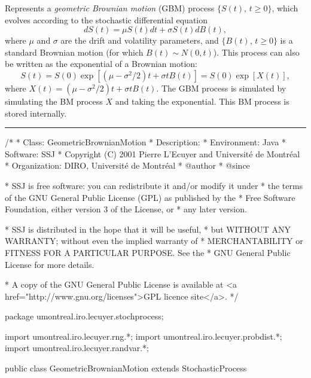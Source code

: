 
Represents a \emph{geometric Brownian motion} (GBM) process $\{S(t),\, t\ge 0\}$,  
which evolves according to the stochastic differential equation 
\begin{equation}
   dS(t) = \mu S(t) dt + \sigma S(t) dB(t),
                                               \label{eq:GBM}
\end{equation}
where $\mu$ and $\sigma$ are the drift and volatility parameters,
and $\{B(t),\, t\ge 0\}$ is a standard Brownian motion 
(for which $B(t)\sim N(0,t)$).
This process can also be written as the exponential of a Brownian motion:
\begin{equation}
  S(t) = S(0) \exp \left[ (\mu - \sigma^{2}/2) t + \sigma t B(t) \right]
       = S(0) \exp \left[ X(t) \right],
                                               \label{eq:GBM2}
\end{equation}
where $X(t) = (\mu - \sigma^{2}/2) t + \sigma t B(t)$.
The GBM process is simulated by simulating the BM process $X$ and taking the exponential.
This BM process is stored internally.

\bigskip\hrule\bigskip

\begin{code}
\begin{hide}
/*
 * Class:        GeometricBrownianMotion
 * Description:  
 * Environment:  Java
 * Software:     SSJ 
 * Copyright (C) 2001  Pierre L'Ecuyer and Université de Montréal
 * Organization: DIRO, Université de Montréal
 * @author       
 * @since

 * SSJ is free software: you can redistribute it and/or modify it under
 * the terms of the GNU General Public License (GPL) as published by the
 * Free Software Foundation, either version 3 of the License, or
 * any later version.

 * SSJ is distributed in the hope that it will be useful,
 * but WITHOUT ANY WARRANTY; without even the implied warranty of
 * MERCHANTABILITY or FITNESS FOR A PARTICULAR PURPOSE.  See the
 * GNU General Public License for more details.

 * A copy of the GNU General Public License is available at
   <a href="http://www.gnu.org/licenses">GPL licence site</a>.
 */
\end{hide}
package umontreal.iro.lecuyer.stochprocess;\begin{hide}
import umontreal.iro.lecuyer.rng.*;
import umontreal.iro.lecuyer.probdist.*;
import umontreal.iro.lecuyer.randvar.*;

\end{hide}

public class GeometricBrownianMotion extends StochasticProcess \begin{hide} {

    protected NormalGen      gen;
    protected BrownianMotion bm;   // The underlying BM process X.
    protected double         mu,
                             sigma;
    protected double[]       mudt;
\end{hide}
\end{code}
